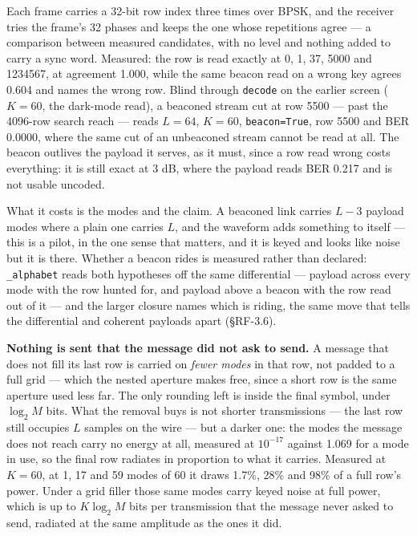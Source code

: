 \documentclass[10pt,letterpaper,twocolumn]{article}
\begin{document}
Each frame carries a 32-bit row index three times over BPSK, and the receiver tries the frame's 32 phases and keeps the one whose repetitions agree --- a comparison between measured candidates, with no level and nothing added to carry a sync word. Measured: the row is read exactly at 0, 1, 37, 5000 and 1234567, at agreement 1.000, while the same beacon read on a wrong key agrees 0.604 and names the wrong row. Blind through \texttt{decode} on the earlier screen (\(K = 60\), the dark-mode read), a beaconed stream cut at row 5500 --- past the 4096-row search reach --- reads \(L=64\), \(K=60\), \texttt{beacon=\allowbreak{}True}, row 5500 and BER 0.0000, where the same cut of an unbeaconed stream cannot be read at all. The beacon outlives the payload it serves, as it must, since a row read wrong costs everything: it is still exact at 3 dB, where the payload reads BER 0.217 and is not usable uncoded.

What it costs is the modes and the claim. A beaconed link carries \(L - 3\) payload modes where a plain one carries \(L\), and the waveform adds something to itself --- this is a pilot, in the one sense that matters, and it is keyed and looks like noise but it is there. Whether a beacon rides is measured rather than declared: \texttt{\_\allowbreak{}alphabet} reads both hypotheses off the same differential --- payload across every mode with the row hunted for, and payload above a beacon with the row read out of it --- and the larger closure names which is riding, the same move that tells the differential and coherent payloads apart (§RF-3.6).

\textbf{Nothing is sent that the message did not ask to send.} A message that does not fill its last row is carried on \emph{fewer modes} in that row, not padded to a full grid --- which the nested aperture makes free, since a short row is the same aperture used less far. The only rounding left is inside the final symbol, under \(\log_2 M\) bits. What the removal buys is not shorter transmissions --- the last row still occupies \(L\) samples on the wire --- but a darker one: the modes the message does not reach carry no energy at all, measured at \(10^{-17}\) against 1.069 for a mode in use, so the final row radiates in proportion to what it carries. Measured at \(K = 60\), at 1, 17 and 59 modes of 60 it draws 1.7\%, 28\% and 98\% of a full row's power. Under a grid filler those same modes carry keyed noise at full power, which is up to \(K\log_2 M\) bits per transmission that the message never asked to send, radiated at the same amplitude as the ones it did.
\end{document}
